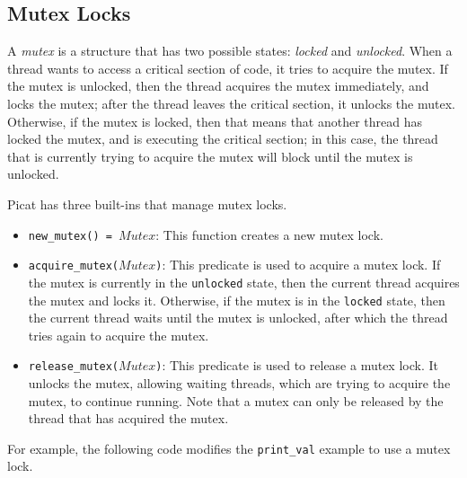\subsection{Mutex Locks}
A \emph{mutex} is a structure that has two possible states: \emph{locked} and \emph{unlocked}.  When a thread wants to access a critical section of code, it tries to acquire the mutex.  If the mutex is unlocked, then the thread acquires the mutex immediately, and locks the mutex; after the thread leaves the critical section, it unlocks the mutex.  Otherwise, if the mutex is locked, then that means that another thread has locked the mutex, and is executing the critical section; in this case, the thread that is currently trying to acquire the mutex will block until the mutex is unlocked.

Picat has three built-ins that manage mutex locks.

\begin{itemize}
\item \texttt{new\_mutex() = $Mutex$}: This function creates a new mutex lock.
\item \texttt{acquire\_mutex($Mutex$)}: This predicate is used to acquire a mutex lock.  If the mutex is currently in the \texttt{unlocked} state, then the current thread acquires the mutex and locks it.  Otherwise, if the mutex is in the \texttt{locked} state, then the current thread waits until the mutex is unlocked, after which the thread tries again to acquire the mutex.
\item \texttt{release\_mutex($Mutex$)}: This predicate is used to release a mutex lock.  It unlocks the mutex, allowing waiting threads, which are trying to acquire the mutex, to continue running.  Note that a mutex can only be released by the thread that has acquired the mutex.
\end{itemize}

For example, the following code modifies the \texttt{print\_val} example to use a mutex lock.

